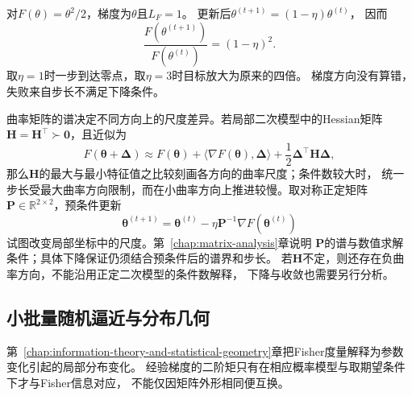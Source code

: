 \begin{example}[步长跨过下降范围]
  \label{ex:future-training-step-size}
  对$F(\theta)=\theta^2/2$，梯度为$\theta$且$L_F=1$。
  更新后$\theta^{(t+1)}=(1-\eta)\theta^{(t)}$，
  因而
  \[
    \frac{F(\theta^{(t+1)})}{F(\theta^{(t)})}
    =
    (1-\eta)^2.
  \]
  取$\eta=1$时一步到达零点，取$\eta=3$时目标放大为原来的四倍。
  梯度方向没有算错，失败来自步长不满足下降条件。
\end{example}

曲率矩阵的谱决定不同方向上的尺度差异。若局部二次模型中的Hessian矩阵
\(\bm H=\bm H^{\top}\succ\bm0\)，且近似为
\[
  F(\bm{\theta}+\bm{\Delta})
  \approx
  F(\bm{\theta})
  +
  \langle\nabla F(\bm{\theta}),\bm{\Delta}\rangle
  +
  \frac{1}{2}
  \bm{\Delta}^{\top}\bm{H}\bm{\Delta},
\]
那么\(\bm H\)的最大与最小特征值之比较刻画各方向的曲率尺度；条件数较大时，
统一步长受最大曲率方向限制，而在小曲率方向上推进较慢。取对称正定矩阵
\(\bm P\in\mathbb{R}^{2\times2}\)，预条件更新
\[
  \bm{\theta}^{(t+1)}
  =
  \bm{\theta}^{(t)}
  -
  \eta\bm{P}^{-1}\nabla F(\bm{\theta}^{(t)})
\]
试图改变局部坐标中的尺度。第~\ref{chap:matrix-analysis}章说明
$\bm{P}$的谱与数值求解条件；具体下降保证仍须结合预条件后的谱界和步长。
若\(\bm H\)不定，则还存在负曲率方向，不能沿用正定二次模型的条件数解释，
下降与收敛也需要另行分析。

\subsection{小批量随机逼近与分布几何}
\label{sec:future-minibatch-stochastic-approximation-geometry}

第~\ref{chap:information-theory-and-statistical-geometry}章把Fisher度量解释为参数
变化引起的局部分布变化。
经验梯度的二阶矩只有在相应概率模型与取期望条件下才与Fisher信息对应，
不能仅因矩阵外形相同便互换。

